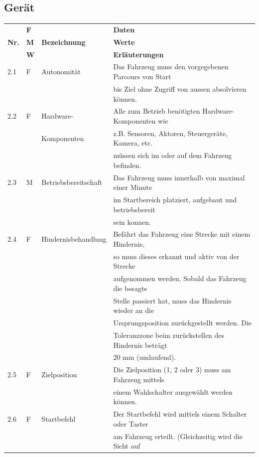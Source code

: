 \documentclass[11pt, a4paper]{article}
\begin{document}
    

\subsection{Gerät}
    \begin{tabular}{|l|l|l|l|}
    \hline
    & \textbf{F} & & \textbf{Daten} \\
    \textbf{Nr.} & \textbf{M} & \textbf{Bezeichnung} & \textbf{Werte} \\
    & \textbf{W} & & \textbf{Erläuterungen} \\
    \hline
    2.1 & F & Autonomität & Das Fahrzeug muss den vorgegebenen Parcours von Start \\
    & & & bis Ziel ohne Zugriff von aussen absolvieren können. \\
    \hline
    2.2 & F & Hardware- & Alle zum Betrieb benötigten Hardware-Komponenten wie \\
    & & Komponenten & z.B. Sensoren, Aktoren, Steuergeräte, Kamera, etc. \\
    & & & müssen sich im oder auf dem Fahrzeug befinden. \\
    \hline
    2.3 & M & Betriebsbereitschaft & Das Fahrzeug muss innerhalb von maximal einer Minute \\
    & & & im Startbereich platziert, aufgebaut und betriebsbereit \\
    & & & sein konnen. \\
    \hline
    2.4 & F & Hindernisbehandlung & Befährt das Fahrzeug eine Strecke mit einem Hindernis, \\
    & & & so muss dieses erkannt und aktiv von der Strecke \\
    & & & aufgenommen werden. Sobald das Fahrzeug die besagte \\
    & & & Stelle passiert hat, muss das Hindernis wieder an die \\
    & & & Ursprungsposition zurückgestellt werden. Die \\
    & & & Toleranzzone beim zurückstellen des Hindernis beträgt \\
    & & & 20 mm (umlaufend). \\
    \hline
    2.5 & F & Zielposition & Die Zielposition (1, 2 oder 3) muss am Fahrzeug mittels \\
    & & & einem Wahlschalter ausgewählt werden können. \\
    \hline
    2.6 & F & Startbefehl & Der Startbefehl wird mittels einem Schalter oder Taster \\
    & & & am Fahrzeug erteilt. (Gleichzeitig wird die Sicht auf \\

\end{tabular}
\end{document}
